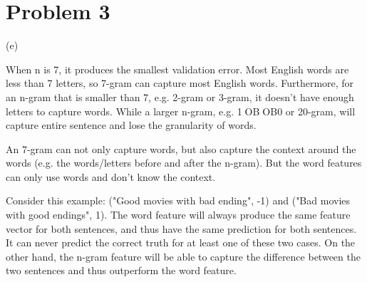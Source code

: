 \documentclass[12pt]{article}
\begin{document}
\section*{Problem 3}
(e)

When n is 7, it produces the smallest validation error. Most English words are less than 7 letters, so 7-gram can capture most English words. Furthermore, for an n-gram that is smaller than 7, e.g. 2-gram or 3-gram, it doesn't have enough letters to capture words. While a larger n-gram, e.g. 1OBOB0 or 20-gram, will capture entire sentence and lose the granularity of words.

An 7-gram can not only capture words, but also capture the context around the words (e.g. the words/letters before and after the n-gram). But the word features can only use words and don't know the context.

Consider this example: ("Good movies with bad ending", -1) and ("Bad movies with good endings", 1). The word feature will always produce the same feature vector for both sentences, and thus have the same prediction for both sentences. It can never predict the correct truth for at least one of these two cases. On the other hand, the n-gram feature will be able to capture the difference between the two sentences and thus outperform the word feature.
\end{document}
